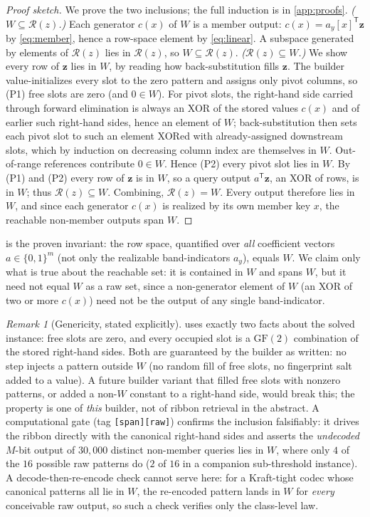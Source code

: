 \documentclass[11pt]{article}
\theoremstyle{definition}
\theoremstyle{plain}
\theoremstyle{remark}
\newtheorem{remark}{Remark}[section]
\newcommand{\B}{\{0,1\}}
\newcommand{\GF}{\mathrm{GF}(2)}
\newcommand{\W}{W}                          %
\newcommand{\Rz}{\mathcal{R}(z)}            %
\newcommand{\bz}{\mathbf{z}}                %
\newcommand{\ay}{a_y}                       %
\newcommand{\cx}{c(x)}                      %
\begin{document}
\begin{proof}[Proof sketch]
We prove the two inclusions; the full induction is in \cref{app:proofs}.
\emph{($\W \subseteq \Rz$.)} Each generator $\cx$ of $\W$ is a member output:
$\cx = \ay[x]^{\mathsf T}\bz$ by \eqref{eq:member}, hence a row-space element by
\eqref{eq:linear}. A subspace generated by elements of $\Rz$ lies in $\Rz$, so
$\W \subseteq \Rz$.
\emph{($\Rz \subseteq \W$.)} We show every row of $\bz$ lies in $\W$, by reading how
back-substitution fills $\bz$. The builder value-initializes every slot to the zero
pattern and assigns only pivot columns, so (P1) free slots are zero (and $0 \in \W$).
For pivot slots, the right-hand side carried through forward elimination is always an
XOR of the stored values $\cx$ and of earlier such right-hand sides, hence an element
of $\W$; back-substitution then sets each pivot slot to such an element XORed with
already-assigned downstream slots, which by induction on decreasing column index are
themselves in $\W$. Out-of-range references contribute $0 \in \W$. Hence (P2) every
pivot slot lies in $\W$. By (P1) and (P2) every row of $\bz$ is in $\W$, so a query
output $a^{\mathsf T}\bz$, an XOR of rows, is in $\W$; thus $\Rz \subseteq \W$.
Combining, $\Rz = \W$. Every output therefore lies in $\W$, and since each generator
$\cx$ is realized by its own member key $x$, the reachable non-member outputs span
$\W$.
\end{proof}

 is the proven invariant: the row space, quantified over
\emph{all} coefficient vectors $a \in \B^m$ (not only the realizable band-indicators
$\ay$), equals $\W$. We claim only what is true about the reachable set: it is
contained in $\W$ and spans $\W$, but it need not equal $\W$ as a raw set, since a
non-generator element of $\W$ (an XOR of two or more $\cx$) need not be the output of
any single band-indicator.

\begin{remark}[Genericity, stated explicitly]
\label{rem:genericity}
 uses exactly two facts about the solved instance: free slots are
zero, and every occupied slot is a $\GF$ combination of the stored right-hand sides.
Both are guaranteed by the builder as written: no step injects a pattern outside $\W$
(no random fill of free slots, no fingerprint salt added to a value). A future builder
variant that filled free slots with nonzero patterns, or added a non-$\W$ constant to
a right-hand side, would break this; the property is one of \emph{this} builder, not
of ribbon retrieval in the abstract. A computational gate (tag
\texttt{[span][raw]}) confirms the inclusion falsifiably: it drives the ribbon directly
with the canonical right-hand sides and asserts the \emph{undecoded} $M$-bit output of
$30{,}000$ distinct non-member queries lies in $\W$, where only $4$ of the $16$ possible
raw patterns do ($2$ of $16$ in a companion sub-threshold instance). A
decode-then-re-encode check cannot serve here: for a Kraft-tight codec whose canonical
patterns all lie in $\W$, the re-encoded pattern lands in $\W$ for \emph{every}
conceivable raw output, so such a check verifies only the class-level law.
\end{remark}
\end{document}
